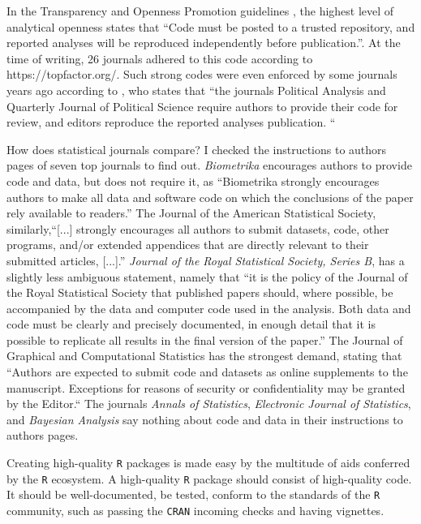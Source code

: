 In the Transparency and Openness Promotion guidelines \parencite{Nosek2015-hh}, the highest level of analytical openness states that ``Code must be posted to a trusted repository, and reported analyses will be reproduced independently before publication.''. At the time of writing, 26 journals adhered to this code according to https://topfactor.org/. Such strong codes were even enforced by some journals years ago according to \textcite{Nosek2015-hh}, who states that ``the journals Political Analysis and Quarterly Journal of Political Science require authors to provide their code for review, and editors reproduce the reported analyses publication. ``

How does statistical journals compare? I checked the instructions to authors pages of seven top journals to find out. \emph{Biometrika} encourages authors to provide code and data, but does not require it, as ``Biometrika strongly encourages authors to make all data and software code on which the conclusions of the paper rely available to readers.'' The Journal of the American Statistical Society, similarly,``[...] strongly encourages all authors to submit datasets, code, other programs, and/or extended appendices that are directly relevant to their submitted articles, [...].'' \emph{Journal of the Royal Statistical Society, Series B}, has a slightly less ambiguous statement, namely that ``it is the policy of the Journal of the Royal Statistical Society that published papers should, where possible, be accompanied by the data and computer code used in the analysis. Both data and code must be clearly and precisely documented, in enough detail that it is possible to replicate all results in the final version of the paper.'' The Journal of Graphical and Computational Statistics has the strongest demand, stating that ``Authors are expected to submit code and datasets as online supplements to the manuscript. Exceptions for reasons of security or confidentiality may be granted by the Editor.`` The journals \emph{Annals of Statistics}, \emph{Electronic Journal of Statistics}, and \emph{Bayesian Analysis} say nothing about code and data in their instructions to authors pages.

Creating high-quality \texttt{R} packages is made easy by the multitude of aids conferred by the \texttt{R} ecosystem. A high-quality \texttt{R} package should consist of high-quality code. It should be well-documented, be tested, conform to the standards of the \texttt{R} community, such as passing the \texttt{CRAN} incoming checks and having vignettes.

